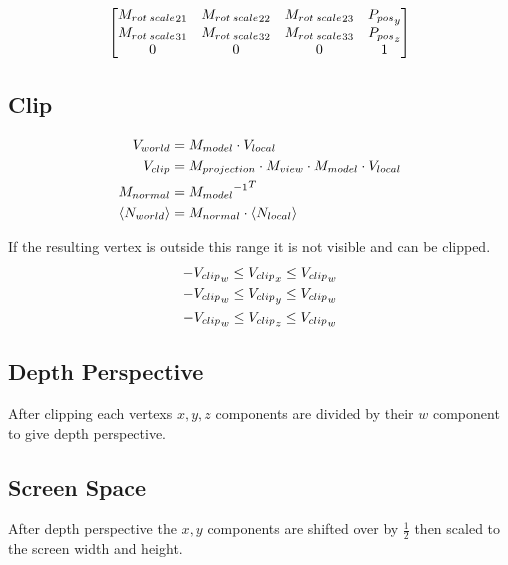 \documentclass[12pt]{article}
\begin{document}
\begin{gather}
\begin{align}
\begin{bmatrix}
			{M_{rot\hspace{0.2em}scale}}_{21}&{M_{rot\hspace{0.2em}scale}}_{22}&{M_{rot\hspace{0.2em}scale}}_{23}&{P_{pos}}_y\\
			{M_{rot\hspace{0.2em}scale}}_{31}&{M_{rot\hspace{0.2em}scale}}_{32}&{M_{rot\hspace{0.2em}scale}}_{33}&{P_{pos}}_z\\
			0&0&0&1
		\end{bmatrix}
\end{align}\end{gather}

\subsection{Clip}


\begin{gather*}\begin{aligned}
	V_{world} &= M_{model} \cdot V_{local} \notag\\
	V_{clip} &= M_{projection} \cdot M_{view} \cdot M_{model} \cdot V_{local} \notag\\
	M_{normal} &= {{M_{model}}^{-1}}^T \notag\\
	\left\langle N_{world} \right\rangle &= M_{normal} \cdot \left\langle N_{local} \right\rangle \notag
\end{aligned}\end{gather*}

If the resulting vertex is outside this range it is not visible and can be clipped.
\begin{gather}
		-{V_{clip}}_w \leq {V_{clip}}_x \leq {V_{clip}}_w \label{clip-bounds}\\
		-{V_{clip}}_w \leq {V_{clip}}_y \leq {V_{clip}}_w \notag\\
		-{V_{clip}}_w \leq {V_{clip}}_z \leq {V_{clip}}_w \notag
\end{gather}

\subsection{Depth Perspective}
After clipping each vertexs $x,y,z$ components are divided by their $w$ component to give depth perspective. 

\subsection{Screen Space}
After depth perspective the $x,y$ components are shifted over by $\frac12$ then scaled to the screen width and height.
\end{document}
